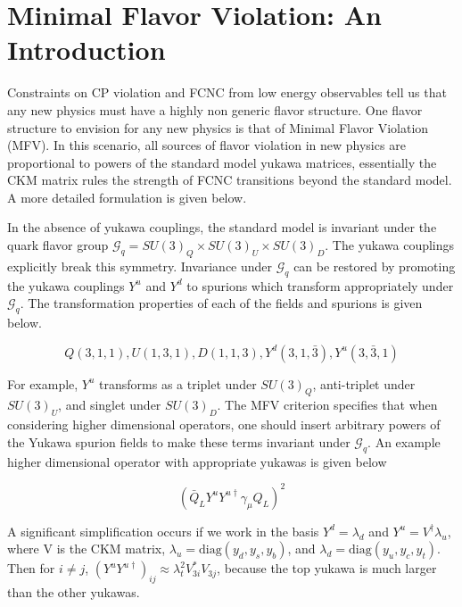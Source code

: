 \documentclass[aps,onecolumn,twoside,secnumarabic,balancelastpage,amsmath,amssymb,nofootinbib,hyperref=pdftex]{revtex4}
\begin{document}
\title{}
\author         {Noah Steinberg}
\date{\today}


\maketitle

\section{Minimal Flavor Violation: An Introduction}
Constraints on CP violation and FCNC from low energy observables tell us that any new physics must have a highly non generic flavor structure. One flavor structure to envision for any new physics is that of Minimal Flavor Violation (MFV). In this scenario, all sources of flavor violation in new physics are proportional to powers of the standard model yukawa matrices, essentially the CKM matrix rules the strength of FCNC transitions beyond the standard model. A more detailed formulation is given below.

In the absence of yukawa couplings, the standard model is invariant under the quark flavor group $\mathcal{G}_{q} = SU(3)_{Q} \times SU(3)_{U} \times SU(3)_{D}$. The yukawa couplings explicitly break this symmetry. Invariance under $\mathcal{G}_{q}$ can be restored by promoting the yukawa couplings $Y^{u}$ and $Y^{d}$ to spurions which transform appropriately under $\mathcal{G}_{q}$. The transformation properties of each of the fields and spurions is given below.

\begin{equation}
Q(3,1,1), U(1,3,1), D(1,1,3), Y^{d}(3,1,\bar{3}), Y^{u}(3,\bar{3},1) 
\end{equation}

For example, $Y^{u}$ transforms as a triplet under $SU(3)_{Q}$, anti-triplet under $SU(3)_{U}$, and singlet under $SU(3)_{D}$. The MFV criterion specifies that when considering higher dimensional operators, one should insert arbitrary powers of the Yukawa spurion fields to make these terms invariant under $\mathcal{G}_{q}$. An example higher dimensional operator with appropriate yukawas is given below

\begin{equation}
(\bar{Q}_{L}Y^{u}Y^{u\dagger}\gamma_{\mu}Q_{L})^{2}
\end{equation}

A significant simplification occurs if we work in the basis $Y^{d} = \lambda_d$ and $Y^{u} = V^{\dagger}\lambda_u$, where V is the CKM matrix, $\lambda_u = \text{diag}(y_d , y_s , y_b)$, and $\lambda_d = \text{diag}(y_u , y_c, y_t)$. Then for $i \neq j$, $(Y^{u}Y^{u\dagger})_{ij} \approx \lambda_{t}^{2}V^{*}_{3i}V_{3j}$, because the top yukawa is much larger than the other yukawas.
\end{document}
